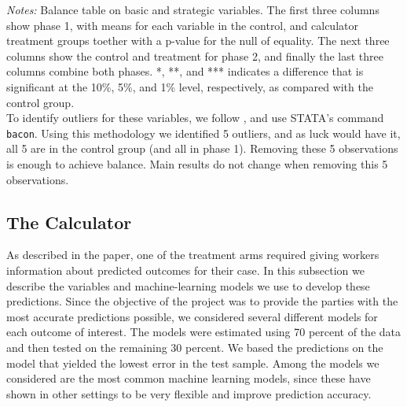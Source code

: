 






\begin{table}[!ht]
  \caption{Balance table}
    \label{balance_table}
    \begin{center}
    \scriptsize{}
    \end{center}
     \scriptsize
    \textit{Notes:} 
    Balance table on basic and strategic variables. The first three columns show phase 1, with means for each variable in the control, and calculator treatment groups toether with a p-value for the null of equality. The next three columns show the control and treatment for phase 2, and finally the last three columns combine both phases. *, **, and *** indicates a difference that is significant at the 10\%, 5\%, and 1\% level, respectively, as compared with the control group.\\
    
     To identify outliers for these variables, we follow \cite{BILLOR2000279}, and use STATA's command \texttt{bacon}. Using this methodology we identified 5 outliers, and as luck would have it, all 5 are in the control group (and all in phase 1). Removing these 5 observations is enough to achieve balance. Main results do not change when removing this 5 observations.
     
\end{table}


\subsection{The Calculator}
\label{calculator_method}

As described in the paper, one of the treatment arms required giving workers information about predicted outcomes for their case. In this subsection we describe the variables and machine-learning models we use to develop these predictions. Since the objective of the project was to provide the parties with the most accurate predictions possible, we considered several different models for each outcome of interest. The models were estimated using 70 percent of the data and then tested on the remaining 30 percent. We based the predictions on the model that yielded the lowest error in the test sample. Among the models we considered are the most common machine learning models, since these have shown in other settings to be very flexible and improve prediction accuracy.

